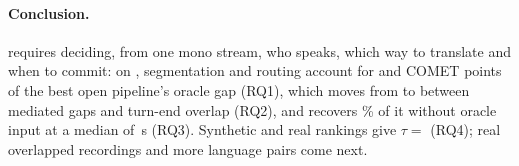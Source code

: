 \paragraph{Conclusion.}
\task requires deciding, from one mono stream, who speaks, which way to translate and when to commit: on \taxi, segmentation and routing account for \tbdtext{} and \tbdtext{} COMET points of the best open pipeline's oracle gap (RQ1), which moves from \tbdtext{} to \tbdtext{} between mediated gaps and turn-end overlap (RQ2), and \model recovers \tbdtext{}\% of it without oracle input at a median \eo of \tbdtext{}\,s (RQ3).
Synthetic and real rankings give $\tau=$ \tbdtext{} (RQ4); real overlapped recordings and more language pairs come next.
